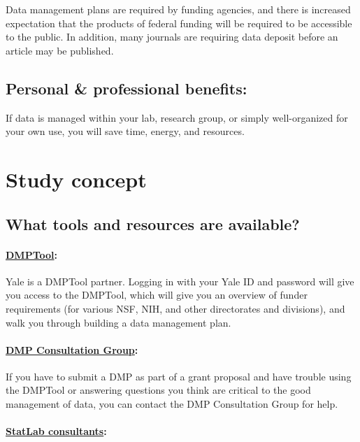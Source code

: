 \documentclass[]{article}
\begin{document}
Data management plans are required by funding agencies, and there is
increased expectation that the products of federal funding will be
required to be accessible to the public. In addition, many journals are
requiring data deposit before an article may be published.

\subsection{Personal \& professional
benefits:}\label{personal-professional-benefits}

If data is managed within your lab, research group, or simply
well-organized for your own use, you will save time, energy, and
resources.

\section{Study concept}\label{study-concept}

\subsection{What tools and resources are
available?}\label{what-tools-and-resources-are-available}

\paragraph{\href{https://dmp.cdlib.org/}{DMPTool}:}\label{dmptool}

Yale is a DMPTool partner. Logging in with your Yale ID and password
will give you access to the DMPTool, which will give you an overview of
funder requirements (for various NSF, NIH, and other directorates and
divisions), and walk you through building a data management plan.

\paragraph{\href{http://csssi.yale.edu/dmp}{DMP Consultation
Group}:}\label{dmp-consultation-group}

If you have to submit a DMP as part of a grant proposal and have trouble
using the DMPTool or answering questions you think are critical to the
good management of data, you can contact the DMP Consultation Group for
help.

\paragraph{\href{http://csssi.yale.edu/csssi-statistical-consultants-schedule}{StatLab
consultants}:}\label{statlab-consultants}
\end{document}
